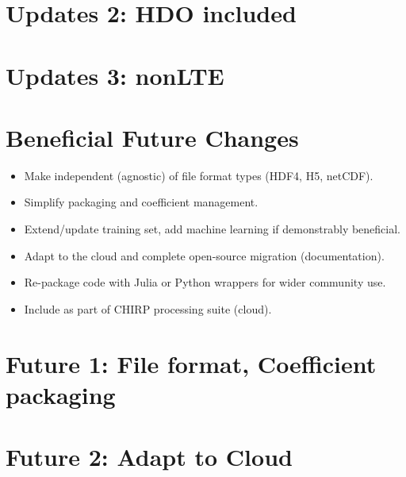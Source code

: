 \documentclass[10pt,t]{article}
\begin{document}
\section{Updates 2: HDO included}
\label{sec:orgba4c83e}

\section{Updates 3: nonLTE}
\label{sec:org2f6bb28}

\section{Beneficial Future Changes}
\label{sec:org28582a2}
\begin{itemize}
\item Make independent (agnostic) of file format types (HDF4, H5, netCDF).
\item Simplify packaging and coefficient management.
\item Extend/update training set, add machine learning if demonstrably beneficial.
\item Adapt to the cloud and complete open-source migration (documentation).
\item Re-package code with Julia or Python wrappers for wider community use.
\item Include as part of CHIRP processing suite (cloud).
\end{itemize}

\section{Future 1: File format, Coefficient packaging}
\label{sec:orgc21da4f}

\section{Future 2: Adapt to Cloud}
\label{sec:orgf169979}
\end{document}
